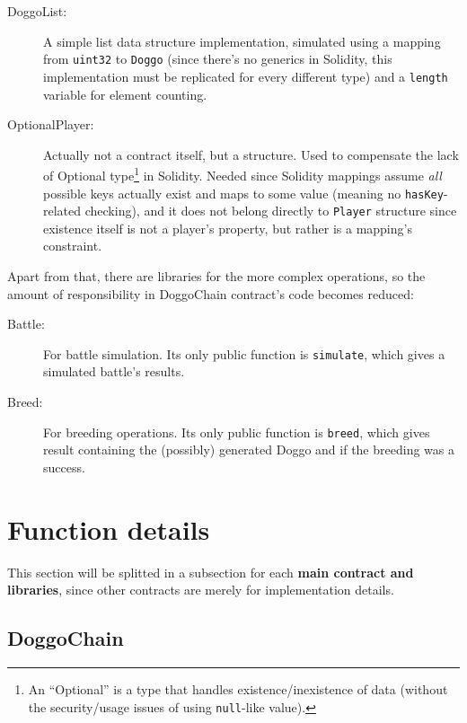 \documentclass{article}
\begin{document}
    \begin{description}
        \item[DoggoList:] A simple list data structure implementation,
            simulated using a mapping from \texttt{uint32} to \texttt{Doggo}
            (since there's no generics in Solidity, this implementation must be
            replicated for every different type) and a \texttt{length} variable
            for element counting.
        \item[OptionalPlayer:] Actually not a contract itself, but a structure.
            Used to compensate the lack of Optional type\footnote{%
                An ``Optional'' is a type that handles existence/inexistence of
                data (without the security/usage issues of using
                \texttt{null}-like value).
            } in Solidity. Needed since Solidity mappings assume \textit{all}
            possible keys actually exist and maps to some value (meaning no
            \texttt{hasKey}-related checking), and it does not belong directly
            to \texttt{Player} structure since existence itself is not a
            player's property, but rather is a mapping's constraint.
    \end{description}

    Apart from that, there are libraries for the more complex operations, so
    the amount of responsibility in DoggoChain contract's code becomes reduced:

    \begin{description}
        \item[Battle:] For battle simulation. Its only public function is
            \texttt{simulate}, which gives a simulated battle's results.
        \item[Breed:] For breeding operations. Its only public function is
            \texttt{breed}, which gives result containing the (possibly)
            generated Doggo and if the breeding was a success.
    \end{description}


    \section{Function details\label{sec:function-desc}}

    This section will be splitted in a subsection for each \textbf{main
    contract and libraries}, since other contracts are merely for
    implementation details.

    \subsection{DoggoChain}
\end{document}
